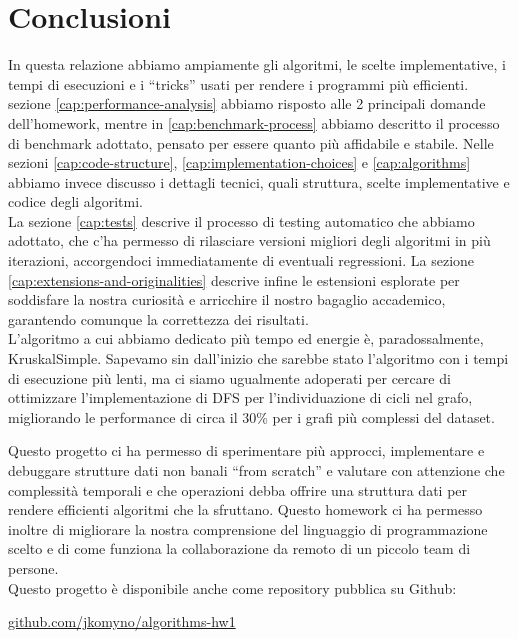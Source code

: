 \section{Conclusioni}
\label{cap:conclusions}

In questa relazione abbiamo ampiamente gli algoritmi, le scelte implementative, i tempi di esecuzioni e i ``tricks'' usati per rendere i programmi più efficienti. \\

\noindent sezione \ref{cap:performance-analysis} abbiamo risposto alle 2 principali domande dell'homework, mentre in \ref{cap:benchmark-process} abbiamo descritto il processo di benchmark adottato, pensato per essere quanto più affidabile e stabile.
Nelle sezioni \ref{cap:code-structure}, \ref{cap:implementation-choices} e \ref{cap:algorithms} abbiamo invece discusso i dettagli tecnici, quali struttura, scelte implementative e codice degli algoritmi. \\

\noindent  La sezione \ref{cap:tests} descrive il processo di testing automatico che abbiamo adottato, che c'ha permesso di rilasciare versioni migliori degli algoritmi in più iterazioni, accorgendoci immediatamente di eventuali regressioni. La sezione \ref{cap:extensions-and-originalities} descrive infine le estensioni esplorate per soddisfare la nostra curiosità e arricchire il nostro bagaglio accademico, garantendo comunque la correttezza dei risultati. \\

\noindent L'algoritmo a cui abbiamo dedicato più tempo ed energie è, paradossalmente, KruskalSimple. Sapevamo sin dall'inizio che sarebbe stato l'algoritmo con i tempi di esecuzione più lenti, ma ci siamo ugualmente adoperati per cercare di ottimizzare l'implementazione di DFS per l'individuazione di cicli nel grafo, migliorando le performance di circa il 30\% per i grafi più complessi del dataset.

\noindent Questo progetto ci ha permesso di sperimentare più approcci, implementare e debuggare strutture dati non banali ``from scratch'' e valutare con attenzione che complessità temporali e che operazioni debba offrire una struttura dati per rendere efficienti algoritmi che la sfruttano. Questo homework ci ha permesso inoltre di migliorare la nostra comprensione del linguaggio di programmazione scelto e di come funziona la collaborazione da remoto di un piccolo team di persone. \\

\noindent Questo progetto è disponibile anche come repository pubblica su Github:

\begin{center}
\href{https://github.com/jkomyno/algorithms-hw1}{github.com/jkomyno/algorithms-hw1}
\end{center}
